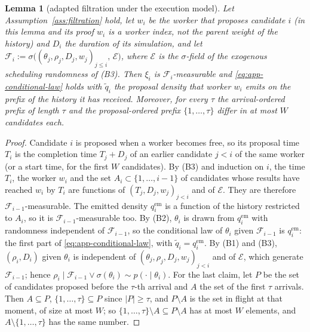 \documentclass[10pt]{article}
\theoremstyle{plain}
\newtheorem{lemma}[theorem]{Lemma}
\theoremstyle{definition}
\begin{document}
\begin{lemma}[adapted filtration under the execution model]\label{lem:adapted}
Let Assumption~\ref{ass:filtration} hold, let $w_i$ be the worker that proposes candidate $i$ (in this lemma and its proof $w_i$ is a worker index, not the parent weight of the history) and $D_i$ the duration of its simulation, and let $\mathcal{F}_i:=\sigma\bigl((\theta_j,\rho_j,D_j,w_j)_{j\le i},\,\mathcal{E}\bigr)$, where $\mathcal{E}$ is the $\sigma$-field of the exogenous scheduling randomness of (B3). Then $\xi_i$ is $\mathcal{F}_i$-measurable and \eqref{eq:app-conditional-law} holds with $\tilde q_i$ the proposal density that worker $w_i$ emits on the prefix of the history it has received. Moreover, for every $\tau$ the arrival-ordered prefix of length $\tau$ and the proposal-ordered prefix $\{1,\dots,\tau\}$ differ in at most $W$ candidates each.
\end{lemma}
\begin{proof}
Candidate $i$ is proposed when a worker becomes free, so its proposal time $T_i$ is the completion time $T_j+D_j$ of an earlier candidate $j<i$ of the same worker (or a start time, for the first $W$ candidates). By (B3) and induction on $i$, the time $T_i$, the worker $w_i$ and the set $A_i\subset\{1,\dots,i-1\}$ of candidates whose results have reached $w_i$ by $T_i$ are functions of $(T_j,D_j,w_j)_{j<i}$ and of $\mathcal{E}$. They are therefore $\mathcal{F}_{i-1}$-measurable. The emitted density $q^{\mathrm{em}}_i$ is a function of the history restricted to $A_i$, so it is $\mathcal{F}_{i-1}$-measurable too. By (B2), $\theta_i$ is drawn from $q^{\mathrm{em}}_i$ with randomness independent of $\mathcal{F}_{i-1}$, so the conditional law of $\theta_i$ given $\mathcal{F}_{i-1}$ is $q^{\mathrm{em}}_i$: the first part of \eqref{eq:app-conditional-law}, with $\tilde q_i=q^{\mathrm{em}}_i$. By (B1) and (B3), $(\rho_i,D_i)$ given $\theta_i$ is independent of $(\theta_j,\rho_j,D_j,w_j)_{j<i}$ and of $\mathcal{E}$, which generate $\mathcal{F}_{i-1}$; hence $\rho_i\mid\mathcal{F}_{i-1}\vee\sigma(\theta_i)\sim p(\cdot\mid\theta_i)$. For the last claim, let $P$ be the set of candidates proposed before the $\tau$-th arrival and $A$ the set of the first $\tau$ arrivals. Then $A\subseteq P$, $\{1,\dots,\tau\}\subseteq P$ since $|P|\ge\tau$, and $P\setminus A$ is the set in flight at that moment, of size at most $W$; so $\{1,\dots,\tau\}\setminus A\subseteq P\setminus A$ has at most $W$ elements, and $A\setminus\{1,\dots,\tau\}$ has the same number.
\end{proof}
\end{document}
